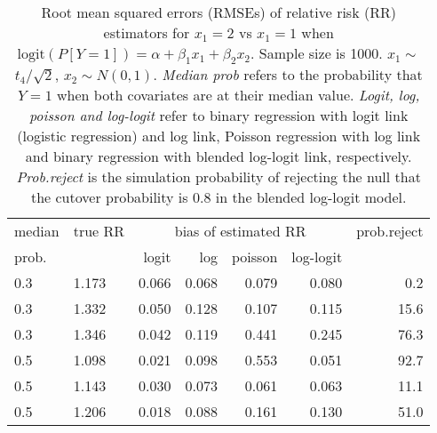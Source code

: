 \documentclass[12pt,a4paper]{article}
\begin{document}
\begin{table}[H] 
\small\sf\centering 
\caption{Root mean squared errors (RMSEs) of relative risk (RR) estimators for $x_1=2$ vs $x_1=1$ when $\mbox{logit}(P[Y=1])=\alpha+\beta_1 x_1 + \beta_2 x_2$. Sample size is 1000. $x_1 \sim $$t_4/\sqrt{2}$, $x_2 \sim N(0,1)$. {\it Median prob} refers to the probability that $Y=1$ when both covariates are at their median value. {\it Logit, log, poisson and log-logit} refer to binary regression with logit link (logistic regression) and log link, Poisson regression with log link and binary regression with blended log-logit link, respectively. {\it Prob.reject} is the simulation probability of rejecting the null that the cutover probability is $0.8$ in the blended log-logit model.} 
\begin{tabular}{llrrrrr} 
\toprule 
median & true RR & \multicolumn{4}{c}{bias of estimated RR} & prob.reject \\ 
prob. & & logit & log & poisson & log-logit  & \\ \midrule 
0.3 & 1.173 & 0.066 & 0.068 & 0.079 & 0.080 &  0.2 \\  
0.3 & 1.332 & 0.050 & 0.128 & 0.107 & 0.115 & 15.6 \\  
0.3 & 1.346 & 0.042 & 0.119 & 0.441 & 0.245 & 76.3 \\  
0.5 & 1.098 & 0.021 & 0.098 & 0.553 & 0.051 & 92.7 \\  
0.5 & 1.143 & 0.030 & 0.073 & 0.061 & 0.063 & 11.1 \\  
0.5 & 1.206 & 0.018 & 0.088 & 0.161 & 0.130 & 51.0 \\  
\bottomrule 
\end{tabular} 
\end{table} 
\end{document}

